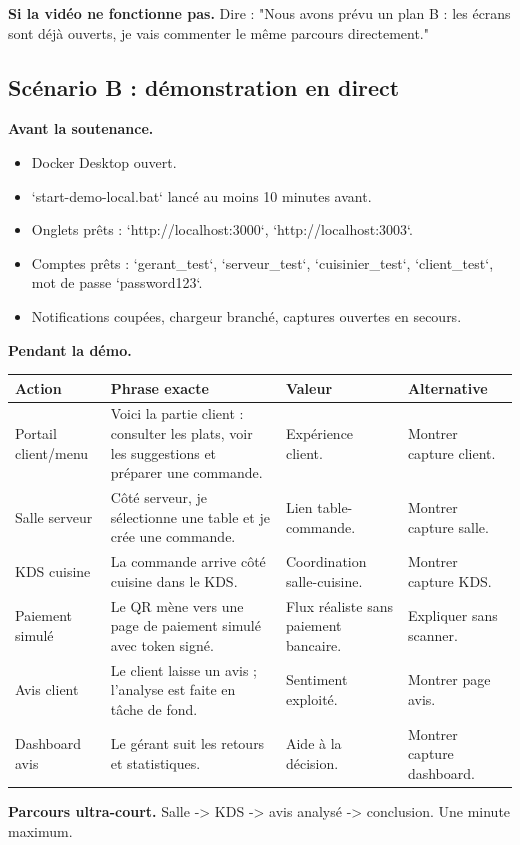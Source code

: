 \documentclass[11pt,a4paper]{article}
\begin{document}
\textbf{Si la vidéo ne fonctionne pas.} Dire : "Nous avons prévu un plan B : les écrans sont déjà ouverts, je vais commenter le même parcours directement."

\subsection{Scénario B : démonstration en direct}

\textbf{Avant la soutenance.}
\begin{itemize}
  \item Docker Desktop ouvert.
  \item `start-demo-local.bat` lancé au moins 10 minutes avant.
  \item Onglets prêts : `http://localhost:3000`, `http://localhost:3003`.
  \item Comptes prêts : `gerant\_test`, `serveur\_test`, `cuisinier\_test`, `client\_test`, mot de passe `password123`.
  \item Notifications coupées, chargeur branché, captures ouvertes en secours.
\end{itemize}

\textbf{Pendant la démo.}
\begin{longtable}{p{3.5cm}p{5.2cm}p{3cm}p{3.2cm}}
\toprule
\textbf{Action} & \textbf{Phrase exacte} & \textbf{Valeur} & \textbf{Alternative}\\
\midrule
Portail client/menu & Voici la partie client : consulter les plats, voir les suggestions et préparer une commande. & Expérience client. & Montrer capture client.\\
Salle serveur & Côté serveur, je sélectionne une table et je crée une commande. & Lien table-commande. & Montrer capture salle.\\
KDS cuisine & La commande arrive côté cuisine dans le KDS. & Coordination salle-cuisine. & Montrer capture KDS.\\
Paiement simulé & Le QR mène vers une page de paiement simulé avec token signé. & Flux réaliste sans paiement bancaire. & Expliquer sans scanner.\\
Avis client & Le client laisse un avis ; l'analyse est faite en tâche de fond. & Sentiment exploité. & Montrer page avis.\\
Dashboard avis & Le gérant suit les retours et statistiques. & Aide à la décision. & Montrer capture dashboard.\\
\bottomrule
\end{longtable}

\textbf{Parcours ultra-court.} Salle -> KDS -> avis analysé -> conclusion. Une minute maximum.
\end{document}
